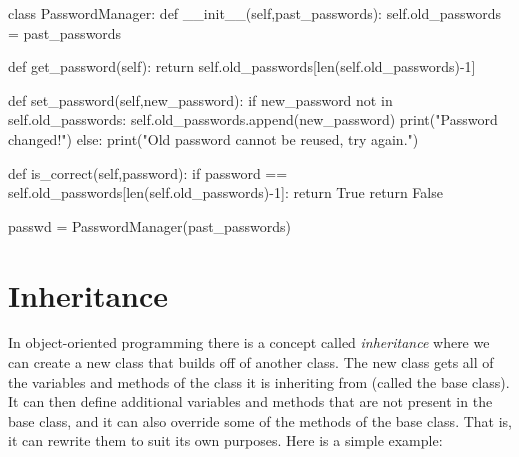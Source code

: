 \documentclass[
  letterpaper,
  DIV=11,
  numbers=noendperiod]{scrreprt}
\newenvironment{Shaded}{\begin{snugshade}}{\end{snugshade}}
\newcommand{\BuiltInTok}[1]{\textcolor[rgb]{0.00,0.23,0.31}{#1}}
\newcommand{\ControlFlowTok}[1]{\textcolor[rgb]{0.00,0.23,0.31}{#1}}
\newcommand{\DecValTok}[1]{\textcolor[rgb]{0.68,0.00,0.00}{#1}}
\newcommand{\FunctionTok}[1]{\textcolor[rgb]{0.28,0.35,0.67}{#1}}
\newcommand{\KeywordTok}[1]{\textcolor[rgb]{0.00,0.23,0.31}{#1}}
\newcommand{\NormalTok}[1]{\textcolor[rgb]{0.00,0.23,0.31}{#1}}
\newcommand{\OperatorTok}[1]{\textcolor[rgb]{0.37,0.37,0.37}{#1}}
\newcommand{\StringTok}[1]{\textcolor[rgb]{0.13,0.47,0.30}{#1}}
\newcommand{\VariableTok}[1]{\textcolor[rgb]{0.07,0.07,0.07}{#1}}
\begin{document}
\begin{Shaded}
\begin{Highlighting}[]
\KeywordTok{class}\NormalTok{ PasswordManager:}
    \KeywordTok{def} \FunctionTok{\_\_init\_\_}\NormalTok{(}\VariableTok{self}\NormalTok{,past\_passwords):}
        \VariableTok{self}\NormalTok{.old\_passwords }\OperatorTok{=}\NormalTok{ past\_passwords}
        
    \KeywordTok{def}\NormalTok{ get\_password(}\VariableTok{self}\NormalTok{):}
        \ControlFlowTok{return} \VariableTok{self}\NormalTok{.old\_passwords[}\BuiltInTok{len}\NormalTok{(}\VariableTok{self}\NormalTok{.old\_passwords)}\OperatorTok{{-}}\DecValTok{1}\NormalTok{]}
    
    \KeywordTok{def}\NormalTok{ set\_password(}\VariableTok{self}\NormalTok{,new\_password):}
        \ControlFlowTok{if}\NormalTok{ new\_password }\KeywordTok{not} \KeywordTok{in} \VariableTok{self}\NormalTok{.old\_passwords:}
            \VariableTok{self}\NormalTok{.old\_passwords.append(new\_password)}
            \BuiltInTok{print}\NormalTok{(}\StringTok{"Password changed!"}\NormalTok{)}
        \ControlFlowTok{else}\NormalTok{:}
            \BuiltInTok{print}\NormalTok{(}\StringTok{"Old password cannot be reused, try again."}\NormalTok{)}
            
    \KeywordTok{def}\NormalTok{ is\_correct(}\VariableTok{self}\NormalTok{,password):}
        \ControlFlowTok{if}\NormalTok{ password }\OperatorTok{==} \VariableTok{self}\NormalTok{.old\_passwords[}\BuiltInTok{len}\NormalTok{(}\VariableTok{self}\NormalTok{.old\_passwords)}\OperatorTok{{-}}\DecValTok{1}\NormalTok{]:}
            \ControlFlowTok{return} \VariableTok{True}
        \ControlFlowTok{return} \VariableTok{False}

\NormalTok{passwd }\OperatorTok{=}\NormalTok{ PasswordManager(past\_passwords)}
\end{Highlighting}
\end{Shaded}

\hypertarget{inheritance}{%
\section{Inheritance}\label{inheritance}}

In object-oriented programming there is a concept called
\emph{inheritance} where we can create a new class that builds off of
another class. The new class gets all of the variables and methods of
the class it is inheriting from (called the base class). It can then
define additional variables and methods that are not present in the base
class, and it can also override some of the methods of the base class.
That is, it can rewrite them to suit its own purposes. Here is a simple
example:
\end{document}
